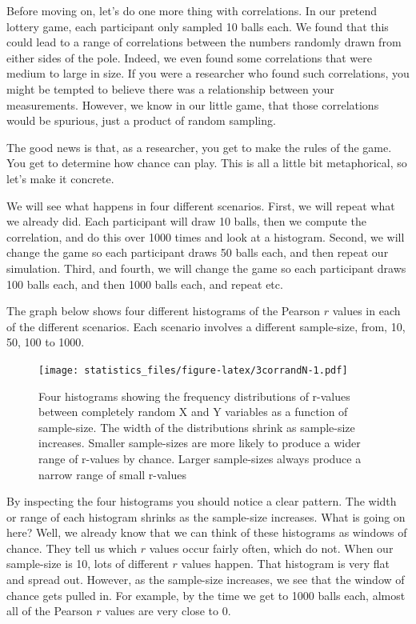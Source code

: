 \documentclass[]{book}
\begin{document}
Before moving on, let's do one more thing with correlations. In our pretend lottery game, each participant only sampled 10 balls each. We found that this could lead to a range of correlations between the numbers randomly drawn from either sides of the pole. Indeed, we even found some correlations that were medium to large in size. If you were a researcher who found such correlations, you might be tempted to believe there was a relationship between your measurements. However, we know in our little game, that those correlations would be spurious, just a product of random sampling.

The good news is that, as a researcher, you get to make the rules of the game. You get to determine how chance can play. This is all a little bit metaphorical, so let's make it concrete.

We will see what happens in four different scenarios. First, we will repeat what we already did. Each participant will draw 10 balls, then we compute the correlation, and do this over 1000 times and look at a histogram. Second, we will change the game so each participant draws 50 balls each, and then repeat our simulation. Third, and fourth, we will change the game so each participant draws 100 balls each, and then 1000 balls each, and repeat etc.

The graph below shows four different histograms of the Pearson \(r\) values in each of the different scenarios. Each scenario involves a different sample-size, from, 10, 50, 100 to 1000.

\begin{figure}
\centering
\texttt{[image: statistics\_files/figure-latex/3corrandN-1.pdf]}
\caption{\label{fig:3corrandN}Four histograms showing the frequency distributions of r-values between completely random X and Y variables as a function of sample-size. The width of the distributions shrink as sample-size increases. Smaller sample-sizes are more likely to produce a wider range of r-values by chance. Larger sample-sizes always produce a narrow range of small r-values}
\end{figure}

By inspecting the four histograms you should notice a clear pattern. The width or range of each histogram shrinks as the sample-size increases. What is going on here? Well, we already know that we can think of these histograms as windows of chance. They tell us which \(r\) values occur fairly often, which do not. When our sample-size is 10, lots of different \(r\) values happen. That histogram is very flat and spread out. However, as the sample-size increases, we see that the window of chance gets pulled in. For example, by the time we get to 1000 balls each, almost all of the Pearson \(r\) values are very close to 0.
\end{document}
